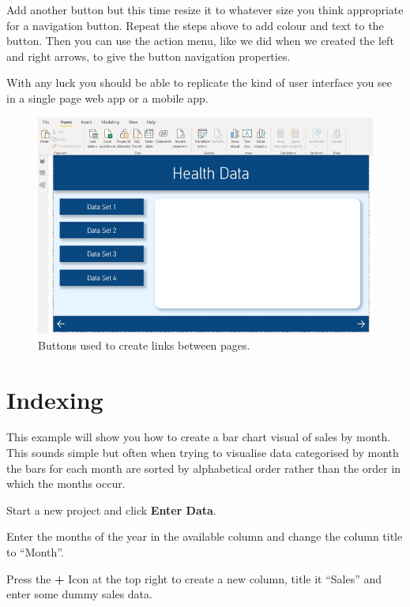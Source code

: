 \documentclass[
]{book}
\begin{document}
Add another button but this time resize it to whatever size you think appropriate for a navigation button. Repeat the steps above to add colour and text to the button. Then you can use the action menu, like we did when we created the left and right arrows, to give the button navigation properties.

With any luck you should be able to replicate the kind of user interface you see in a single page web app or a mobile app.

\begin{figure}
\centering
\includegraphics{bi13.jpg}
\caption{Buttons used to create links between pages.}
\end{figure}

\hypertarget{indexing}{%
\section{Indexing}\label{indexing}}

This example will show you how to create a bar chart visual of sales by month. This sounds simple but often when trying to visualise data categorised by month the bars for each month are sorted by alphabetical order rather than the order in which the months occur.

Start a new project and click \textbf{Enter Data}.

Enter the months of the year in the available column and change the column title to ``Month''.

Press the \textbf{+} Icon at the top right to create a new column, title it ``Sales'' and enter some dummy sales data.
\end{document}
